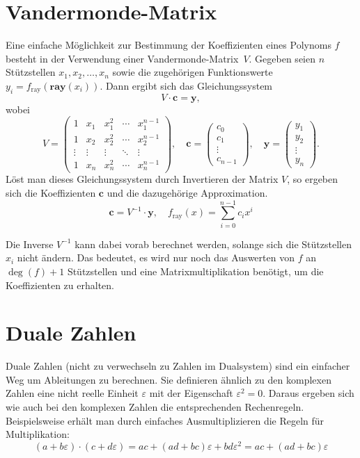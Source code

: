 \documentclass[
	ngerman,%
	accentcolor=9c,%
	ruledheaders=section,%
	class=report,%
	thesis={type=bachelor},%
	fontsize=11pt,%
	parskip=half-,%
	custommargins=true,%
	marginpar=false,%
]{tudapub}
\begin{document}
\section{Vandermonde-Matrix}
\label{sec:Vandermonde}
Eine einfache Möglichkeit zur Bestimmung der Koeffizienten eines Polynoms \(f\) besteht in der Verwendung einer Vandermonde-Matrix~$V$. Gegeben seien $n$ Stützstellen $x_1, x_2, \dotsc, x_n$ sowie die zugehörigen Funktionswerte $y_i=f_\text{ray}(\mathbf{ray}(x_i))$. Dann ergibt sich das Gleichungssystem
\[
V \cdot \mathbf{c} = \mathbf{y},
\]
wobei
\[
V = 
\begin{pmatrix}
1 & x_1 & x_1^2 & \cdots & x_1^{n-1} \\
1 & x_2 & x_2^2 & \cdots & x_2^{n-1} \\
\vdots & \vdots & \vdots & \ddots & \vdots \\
1 & x_n & x_n^2 & \cdots & x_n^{n-1}
\end{pmatrix},
\quad
\mathbf{c} = 
\begin{pmatrix}
c_0 \\ c_1 \\ \vdots \\ c_{n-1}
\end{pmatrix},
\quad
\mathbf{y} = 
\begin{pmatrix}
y_1 \\ y_2 \\ \vdots \\ y_n
\end{pmatrix}.
\]
Löst man dieses Gleichungssystem durch Invertieren der Matrix $V$, so ergeben sich die Koeffizienten $\mathbf{c}$ und die dazugehörige Approximation.
\[
\mathbf{c} = V^{-1} \cdot \mathbf{y},\quad f_\text{ray}(x)=\sum_{i=0}^{n-1}{c_ix^i}
\]

Die Inverse $V^{-1}$ kann dabei vorab berechnet werden, solange sich die Stützstellen $x_i$ nicht ändern.
Das bedeutet, es wird nur noch das Auswerten von \(f\) an \(\deg(f) + 1\) Stützstellen und eine Matrixmultiplikation benötigt, um die Koeffizienten zu erhalten.

\section{Duale Zahlen}
Duale Zahlen (nicht zu verwechseln zu Zahlen im Dualsystem) sind ein einfacher Weg um Ableitungen zu berechnen.
Sie definieren ähnlich zu den komplexen Zahlen eine nicht reelle Einheit \(\varepsilon\) mit der Eigenschaft \(\varepsilon^2=0\).
Daraus ergeben sich wie auch bei den komplexen Zahlen die entsprechenden Rechenregeln.
Beispielsweise erhält man durch einfaches Ausmultiplizieren die Regeln für Multiplikation:
\[(a + b \varepsilon)\cdot( c+ d \varepsilon)=a c + (a d + b c)\varepsilon + b d \varepsilon^2 =a c + (a d + b c)\varepsilon\]
\end{document}
